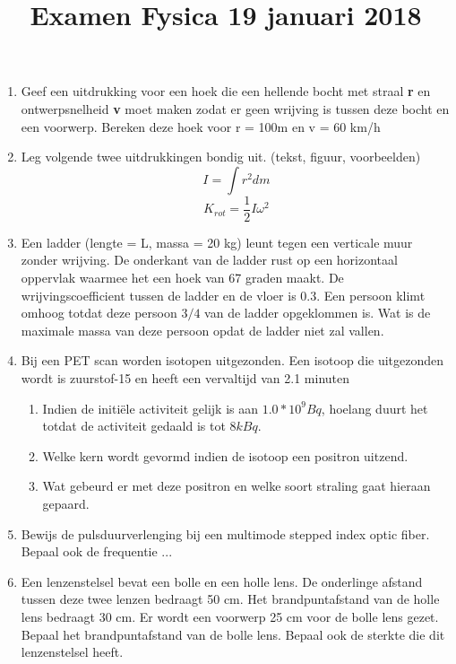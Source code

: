 \documentclass{article}
\begin{document}
\title{Examen Fysica 19 januari 2018}
\date{}
\maketitle

\begin{enumerate}
        \item {Geef een uitdrukking voor een hoek die een hellende bocht met straal {\bf r} en ontwerpsnelheid
        {\bf v} moet maken zodat er geen wrijving is tussen deze bocht en een voorwerp. Bereken deze hoek voor r = 100m en v = 60 km/h}
        \item {Leg volgende twee uitdrukkingen bondig uit. (tekst, figuur, voorbeelden)
              $$I = \int r^{2} dm$$
              $$K_{rot}=\frac{1}{2}I\omega^{2}$$}
        \item {Een ladder (lengte = L, massa = 20 kg) leunt tegen een verticale muur zonder wrijving. De onderkant van de ladder rust op een horizontaal oppervlak waarmee het een hoek van 67 graden maakt. De wrijvingscoefficient tussen de ladder en de vloer is 0.3. Een persoon klimt omhoog totdat deze persoon $3/4$ van de ladder opgeklommen is. Wat is de maximale massa van deze persoon opdat de ladder niet zal vallen.}     
        \item {Bij een PET scan worden isotopen uitgezonden. Een isotoop die uitgezonden wordt is zuurstof-15 en heeft een vervaltijd van 2.1 minuten
        \begin{enumerate}
                \item {Indien de initiële activiteit gelijk is aan $1.0 *10^9 Bq$, hoelang duurt het totdat de activiteit gedaald is tot $8 kBq$.}
                \item {Welke kern wordt gevormd indien de isotoop een positron uitzend.}
                \item {Wat gebeurd er met deze positron en welke soort straling gaat hieraan gepaard.}
        \end{enumerate}}
        \item {Bewijs de pulsduurverlenging bij een multimode stepped index optic fiber. Bepaal ook de frequentie ...}
        \item {Een lenzenstelsel bevat een bolle en een holle lens. De onderlinge afstand tussen deze twee lenzen bedraagt 50 cm. Het brandpuntafstand van de holle lens bedraagt 30 cm. Er wordt een voorwerp 25 cm voor de bolle lens gezet. Bepaal het brandpuntafstand van de bolle lens. Bepaal ook de sterkte die dit lenzenstelsel heeft.}

\end{enumerate}
\end{document}

